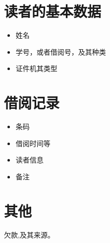 \documentclass[UTF8]{ctexrep}
\begin{document}
    \section{读者的基本数据}
    \begin{itemize}
    	\item 姓名
    	\item 学号，或者借阅号，及其种类
    	\item 证件机其类型
    \end{itemize}
    \section{借阅记录}
    \begin{itemize}
    	\item 条码
    	\item 借阅时间等
    	\item 读者信息
    	\item 备注
    \end{itemize}
    \section{其他}
    欠款,及其来源。
\end{document}
